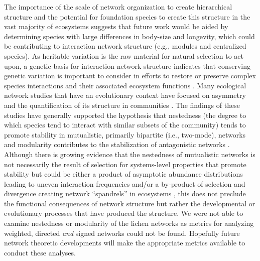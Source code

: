 \documentclass[fleqn,12pt]{olplainarticle}
\begin{document}
The importance of the scale of network organization to create
hierarchical structure \citep{Guimaraes2020TheOrganization} and the
potential for foundation species to create this structure in the vast
majority of ecosystems \citep{Ellison2005, Whitham2006a} suggests that
future work would be aided by determining species with large
differences in body-size and longevity, which could be contributing to
interaction network structure (e.g., modules and centralized
species). As heritable variation is the raw material for natural
selection to act upon, a genetic basis for interaction network
structure indicates that conserving genetic variation is important to
consider in efforts to restore or preserve complex species
interactions and their associated ecosystem functions \citep{
  Whitham2012, Evans2013, Whitham2020IntraspecificEvolution}. Many
ecological network studies that have an evolutionary context have
focused on asymmetry and the quantification of its structure in
communities \citep{Bascompte2006, Diaz-Castelazo2010, Guimaraes2011,
  Thompson2013}. The findings of these studies have generally
supported the hypothesis that nestedness (the degree to which species
tend to interact with similar subsets of the community) tends to
promote stability in mutualistic, primarily bipartite (i.e.,
two-mode), networks and modularity contributes to the stabilization of
antagonistic networks \citep{Elias2013EvolutionaryNetwork,
  Grilli2016ModularityCommunities}. Although there is growing evidence
that the nestedness of mutualistic networks is not necessarily the
result of selection for systems-level properties that promote
stability but could be either a product of asymptotic abundance
distributions leading to uneven interaction frequencies
\citep{Staniczenko2013TheNetworks} and/or a by-product of selection
and divergence creating network ``spandrels'' in ecosystems
\citep{Valverde2018TheSpandrel}, this does not preclude the functional
consequences of network structure but rather the developmental or
evolutionary processes that have produced the structure. We were not
able to examine nestedness or modularity of the lichen networks as
metrics for analyzing weighted, directed \textit{and} signed networks
could not be found. Hopefully future network theoretic developments
will make the appropriate metrics available to conduct these analyses.
\end{document}
